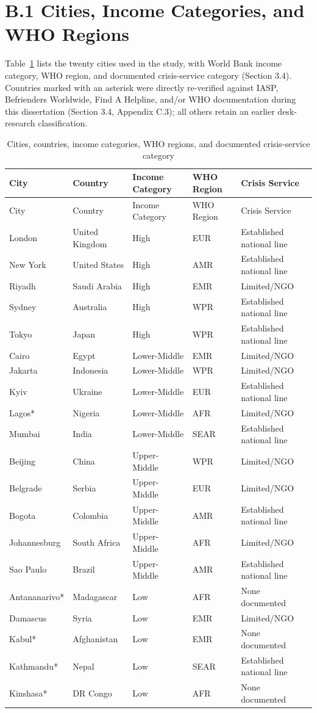 \section*{B.1 Cities, Income Categories, and WHO Regions}

Table~\ref{tab:cities} lists the twenty cities used in the study, with World Bank income category, WHO region, and documented crisis-service category (Section 3.4). Countries marked with an asterisk were directly re-verified against IASP, Befrienders Worldwide, Find A Helpline, and/or WHO documentation during this dissertation (Section 3.4, Appendix C.3); all others retain an earlier desk-research classification.

\begin{longtable}{lllll}
\caption{Cities, countries, income categories, WHO regions, and documented crisis-service category} \label{tab:cities} \\
\toprule
City & Country & Income Category & WHO Region & Crisis Service \\
\midrule
\endfirsthead
\toprule
City & Country & Income Category & WHO Region & Crisis Service \\
\midrule
\endhead
London & United Kingdom & High & EUR & Established national line \\
New York & United States & High & AMR & Established national line \\
Riyadh & Saudi Arabia & High & EMR & Limited/NGO \\
Sydney & Australia & High & WPR & Established national line \\
Tokyo & Japan & High & WPR & Established national line \\
Cairo & Egypt & Lower-Middle & EMR & Limited/NGO \\
Jakarta & Indonesia & Lower-Middle & WPR & Limited/NGO \\
Kyiv & Ukraine & Lower-Middle & EUR & Established national line \\
Lagos* & Nigeria & Lower-Middle & AFR & Limited/NGO \\
Mumbai & India & Lower-Middle & SEAR & Established national line \\
Beijing & China & Upper-Middle & WPR & Limited/NGO \\
Belgrade & Serbia & Upper-Middle & EUR & Limited/NGO \\
Bogota & Colombia & Upper-Middle & AMR & Established national line \\
Johannesburg & South Africa & Upper-Middle & AFR & Limited/NGO \\
Sao Paulo & Brazil & Upper-Middle & AMR & Established national line \\
Antananarivo* & Madagascar & Low & AFR & None documented \\
Damascus & Syria & Low & EMR & Limited/NGO \\
Kabul* & Afghanistan & Low & EMR & None documented \\
Kathmandu* & Nepal & Low & SEAR & Established national line \\
Kinshasa* & DR Congo & Low & AFR & None documented \\
\bottomrule
\end{longtable}


